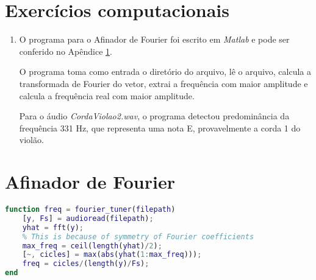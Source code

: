 \documentclass{article}
\begin{document}
    \section*{Exercícios computacionais}

        \begin{enumerate}
            \item O programa para o Afinador de Fourier
                foi escrito em \textit{Matlab} e pode ser conferido
                no Apêndice \ref{appendix:tuner}.

                O programa toma como entrada o diretório do arquivo,
                lê o arquivo, calcula a transformada de Fourier do vetor, extrai
                a frequência com maior amplitude e calcula a frequência real
                com maior amplitude.

                Para o áudio \textit{CordaViolao2.wav}, o programa detectou
                predominância da frequência 331 Hz, que representa uma nota E,
                provavelmente a corda 1 do violão.
        \end{enumerate}

    \newpage

    \appendix

        \section{Afinador de Fourier}
            \label{appendix:tuner}

            \begin{lstlisting}[language=Matlab]
function freq = fourier_tuner(filepath)
    [y, Fs] = audioread(filepath);
    yhat = fft(y);
    % This is because of symmetry of Fourier coefficients
    max_freq = ceil(length(yhat)/2);
    [~, cicles] = max(abs(yhat(1:max_freq)));
    freq = cicles/(length(y)/Fs);
end
            \end{lstlisting}
\end{document}
